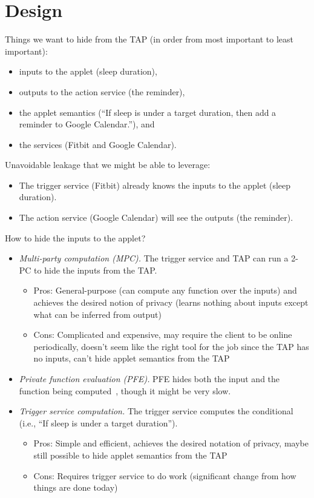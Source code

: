 \section{Design}
\label{sec:design}

Things we want to hide from the TAP (in order from most important to least
important):
\begin{itemize}[leftmargin=*]
  \item inputs to the applet (sleep duration),
  \item outputs to the action service (the reminder),
  \item the applet semantics (``If sleep is under a target duration, then add a
    reminder to Google Calendar.''), and
  \item the services (Fitbit and Google Calendar).
\end{itemize}\bigskip

Unavoidable leakage that we might be able to leverage:
\begin{itemize}[leftmargin=*]
  \item The trigger service (Fitbit) already knows the inputs to the applet
    (sleep duration).
  \item The action service (Google Calendar) will see the outputs (the
    reminder).
\end{itemize}\bigskip

How to hide the inputs to the applet?
\begin{itemize}[leftmargin=*]
  \item \emph{Multi-party computation (MPC).} The trigger service and TAP can
    run a 2-PC to hide the inputs from the TAP.
    \begin{itemize}
      \item Pros: General-purpose (can compute any function over the inputs) and
        achieves the desired notion of privacy (learns nothing about inputs
        except what can be inferred from output)
      \item Cons: Complicated and expensive, may require the client to be online
        periodically, doesn't seem like the right tool for the job since the TAP
        has no inputs, can't hide applet semantics from the TAP
    \end{itemize}
  \item \emph{Private function evaluation (PFE).} PFE hides both the input and
    the function being computed~\cite{DBLP:conf/eurocrypt/MohasselS13}, though
    it might be very slow.
  \item \emph{Trigger service computation.} The trigger service computes the
    conditional (i.e., ``If sleep is under a target duration'').
    \begin{itemize}
      \item Pros: Simple and efficient, achieves the desired notation of
        privacy, maybe still possible to hide applet semantics from the TAP
      \item Cons: Requires trigger service to do work (significant change from
        how things are done today)
    \end{itemize}
\end{itemize}\bigskip


